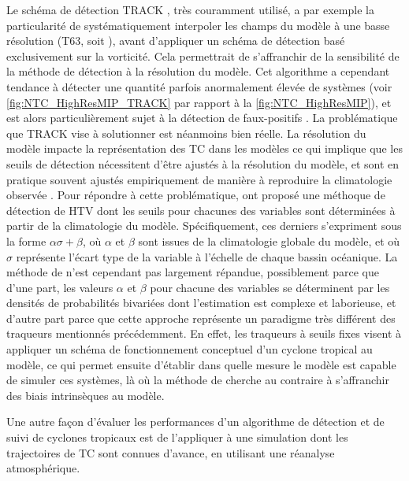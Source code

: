 \documentclass[../main.tex]{subfiles}
\begin{document}
Le schéma de détection TRACK \parencite{hodges_how_2017}, très couramment utilisé, a par exemple la particularité de systématiquement interpoler les champs du
modèle à une basse résolution (T63, soit ), avant d'appliquer un schéma de détection basé exclusivement sur la vorticité. Cela permettrait de
s'affranchir de la sensibilité de la méthode de détection à la résolution du modèle. Cet algorithme a cependant tendance à détecter une quantité parfois
anormalement élevée de systèmes (voir \cref{fig:NTC_HighResMIP_TRACK} par rapport à la \cref{fig:NTC_HighResMIP}), et est alors particulièrement sujet à la
détection de faux-positifs \parencite{bourdin_intercomparison_2022}. La problématique que TRACK vise à solutionner est néanmoins bien réelle. La résolution du
modèle impacte la représentation des TC dans les modèles ce qui implique que les seuils de détection nécessitent d'être ajustés à la résolution du modèle, et
sont en pratique souvent ajustés empiriquement de manière à reproduire la climatologie observée \parencite{walsh_objectively_2007,tory_development_2013}. Pour
répondre à cette problématique, \cite{camargo_improving_2002} ont proposé une méthoque de détection de HTV dont les seuils pour chacunes des variables sont
déterminées à partir de la climatologie du modèle. Spécifiquement, ces derniers s'expriment sous la forme $\alpha \sigma + \beta$, où $\alpha$ et $\beta$ sont
issues de la climatologie globale du modèle, et où $\sigma$ représente l'écart type de la variable à l'échelle de chaque bassin océanique. La méthode de
\cite{camargo_improving_2002} n'est cependant pas largement répandue, possiblement parce que d'une part, les valeurs $\alpha$ et $\beta$ pour chacune des
variables se déterminent par les densités de probabilités bivariées dont l'estimation est complexe et laborieuse, et d'autre part parce que cette approche
représente un paradigme très différent des traqueurs mentionnés précédemment. En effet, les traqueurs à seuils fixes visent à appliquer un schéma de
fonctionnement conceptuel d'un cyclone tropical au modèle, ce qui permet ensuite d'établir dans quelle mesure le modèle est capable de simuler ces systèmes, là
où la méthode de \cite{camargo_improving_2002} cherche au contraire à s'affranchir des biais intrinsèques au modèle.

Une autre façon d'évaluer les performances d'un algorithme de détection et de suivi de cyclones tropicaux est de l'appliquer à une simulation dont les
trajectoires de TC sont connues d'avance, en utilisant une réanalyse atmosphérique.
\end{document}
